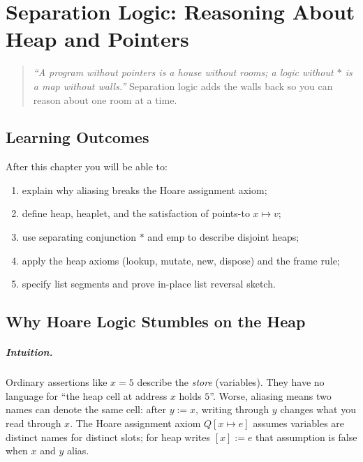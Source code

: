\chapter{Separation Logic: Reasoning About Heap and Pointers}
\label{ch:separation}

\begin{quote}
\emph{``A program without pointers is a house without rooms; a logic without {\large$*$} is a map without walls.''} Separation logic adds the walls back so you can reason about one room at a time.
\end{quote}

\noindent{}
\vspace{0.4em}

\section*{Learning Outcomes}
After this chapter you will be able to:
\begin{enumerate}[label=(L\arabic*)]
    \item explain why aliasing breaks the Hoare assignment axiom;
    \item define heap, heaplet, and the satisfaction of points-to $x\mapsto v$;
    \item use separating conjunction $*$ and $\text{emp}$ to describe disjoint heaps;
    \item apply the heap axioms (lookup, mutate, new, dispose) and the frame rule;
    \item specify list segments and prove in-place list reversal sketch.
\end{enumerate}

\section{Why Hoare Logic Stumbles on the Heap}
\label{sec:aliasing}
\paragraph{Intuition.} Ordinary assertions like $x=5$ describe the \emph{store} (variables). They have no language for ``the heap cell at address $x$ holds $5$''. Worse, aliasing means two names can denote the same cell: after $y:=x$, writing through $y$ changes what you read through $x$. The Hoare assignment axiom $Q[x\mapsto e]$ assumes variables are distinct names for distinct slots; for heap writes $[x]:=e$ that assumption is false when $x$ and $y$ alias.

